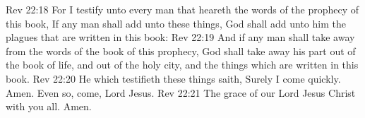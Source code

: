 \vs Rev 22:18 For I testify unto every man that heareth the words of the prophecy of this book, If any man shall add unto these things, God shall add unto him the plagues that are written in this book:
\vs Rev 22:19 And if any man shall take away from the words of the book of this prophecy, God shall take away his part out of the book of life, and out of the holy city, and  the things which are written in this book.
\vs Rev 22:20 He which testifieth these things saith, Surely I come quickly. Amen. Even so, come, Lord Jesus.
\vs Rev 22:21 The grace of our Lord Jesus Christ  with you all. Amen.
